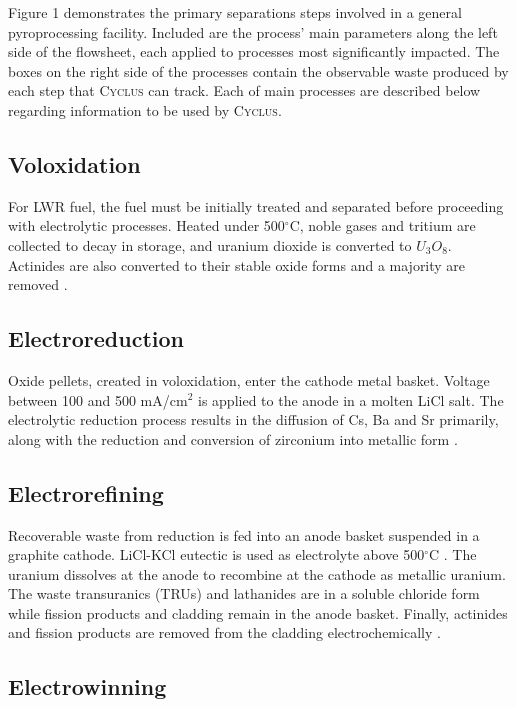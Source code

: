 \documentclass{anstrans}
\newcommand{\Cyclus}{\textsc{Cyclus}\xspace}%
\begin{document}
Figure 1 demonstrates the primary separations steps involved in a general pyroprocessing facility. Included are the process' 
main parameters along the left side of the flowsheet, each applied to processes most significantly impacted. The boxes on the 
right side of the processes contain the observable waste produced by each step that \Cyclus can track. Each of main processes 
are described below regarding information to be used by \Cyclus.

\subsection{Voloxidation}

For LWR fuel, the fuel must be initially treated and separated before proceeding with electrolytic processes. Heated under 
500$^{\circ}$C, noble gases and tritium are collected to decay in storage, and uranium dioxide is converted to $U_3O_8$. 
Actinides are also converted to their stable oxide forms and a majority are removed \cite{flowsheet_1998}. 

\subsection{Electroreduction}

Oxide pellets, created in voloxidation, enter the cathode metal basket. Voltage between 100 and 500 mA/cm$^2$ is applied 
to the anode in a molten LiCl salt. The electrolytic reduction process results in the diffusion of Cs, Ba and Sr primarily, 
along with the reduction and conversion of zirconium into metallic form \cite{choi_electrochemical_2015,flowsheet_1998}.

\subsection{Electrorefining}

Recoverable waste from reduction is fed into an anode basket suspended in a graphite cathode. LiCl-KCl eutectic is used as 
electrolyte above 500$^{\circ}$C \cite{flowsheet_1998,lee_korean_2011}. The uranium dissolves at the anode to recombine at 
the cathode as metallic uranium. The waste transuranics (TRUs) and lathanides are in a soluble chloride form  while fission 
products and cladding remain in the anode basket. Finally, actinides and fission products are removed from the cladding 
electrochemically \cite{lee_korean_2011}.

\subsection{Electrowinning}
\end{document}
